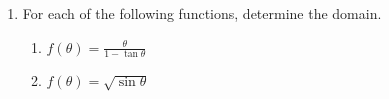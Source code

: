 \documentclass[12pt]{article}
\newif\ifans
\begin{document}
\begin{enumerate}
\ifans\fbox{\parbox{1\linewidth}{
\begin{center}
\begin{tabular}{l|c|c}
& Domain & Range\\
\hline
$\sin{\theta}$ & $(-\infty,\infty)$ & $[-1,1]$\\
\hline
$\cos{\theta}$ & $(-\infty,\infty)$ & $[-1,1]$\\
\hline
$\tan{\theta}$ & $\theta\neq(2k+1)\tfrac{\pi}{2}$ & $(-\infty,\infty)$\\
\hline
$\csc{\theta}$ & $\theta\neq \pi k$ & $(-\infty,-1]\cup[1,\infty)$\\
\hline
$\sec{\theta}$ & $\theta\neq(2k+1)\tfrac{\pi}{2}$ & $(-\infty,-1]\cup[1,\infty)$\\
\hline
$\cot{\theta}$ & $\theta\neq \pi k$ & $(-\infty,\infty)$\\
\end{tabular}
\end{center}
Where $k$ is any integer.
}} \fi

\item For each of the following functions, determine the domain.  

\begin{enumerate}

\item $f(\theta)=\frac{\theta}{1-\tan{\theta}}$

\ifans\fbox{$\theta\neq \frac{\pi}{4}+\pi k$ and $\theta \neq \frac{\pi}{2}+\pi k$ where $k$ is any integer.} \fi

\item $f(\theta)=\sqrt{\sin{\theta}}$

\ifans \fbox{ $\bigcup\limits_{k=-\infty}^{\infty} \left[2k \pi, (2k+1)\pi\right]=\dots [-2\pi,-\pi]\cup[0,\pi]\cup[2\pi,3\pi]\dots$} \fi

\end{enumerate}


\end{enumerate}
\end{document}
